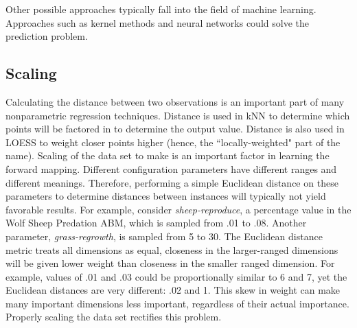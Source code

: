 Other possible approaches typically fall into the field of machine learning.
Approaches such as kernel methods and neural networks could solve the prediction problem.


\subsection{Scaling}

Calculating the distance between two observations is an important part of many nonparametric regression techniques.
Distance is used in kNN to determine which points will  be factored in to determine the output value.
Distance is also used in LOESS to weight closer points higher (hence, the ``locally-weighted" part of the name).
Scaling of the data set to make is an important factor in learning the forward mapping.
Different configuration parameters have different ranges and different meanings.
Therefore, performing a simple Euclidean distance on these parameters to determine distances between instances will typically not yield favorable results.
For example, consider \textit{sheep-reproduce}, a percentage value in the Wolf Sheep Predation ABM, which is sampled from .01 to .08.
Another parameter, \textit{grass-regrowth}, is sampled from 5 to 30.
The Euclidean distance metric treats all dimensions as equal, closeness in the larger-ranged dimensions will be given lower weight than closeness in the smaller ranged dimension.
For example, values of .01 and .03 could be proportionally similar to 6 and 7, yet the Euclidean distances are very different: .02 and 1.
This skew in weight can make many important dimensions less important, regardless of their actual importance.
Properly scaling the data set rectifies this problem.



